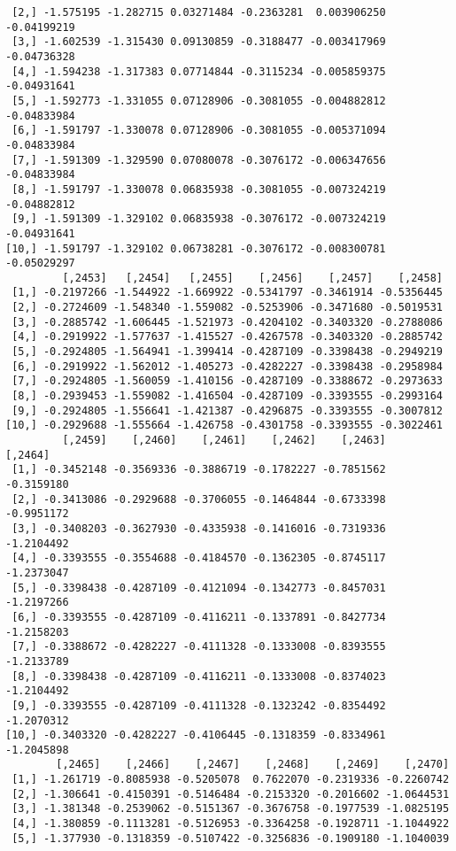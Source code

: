 \documentclass[
  letterpaper,
  DIV=11,
  numbers=noendperiod]{scrreprt}
\begin{document}
\begin{verbatim}
 [2,] -1.575195 -1.282715 0.03271484 -0.2363281  0.003906250 -0.04199219
 [3,] -1.602539 -1.315430 0.09130859 -0.3188477 -0.003417969 -0.04736328
 [4,] -1.594238 -1.317383 0.07714844 -0.3115234 -0.005859375 -0.04931641
 [5,] -1.592773 -1.331055 0.07128906 -0.3081055 -0.004882812 -0.04833984
 [6,] -1.591797 -1.330078 0.07128906 -0.3081055 -0.005371094 -0.04833984
 [7,] -1.591309 -1.329590 0.07080078 -0.3076172 -0.006347656 -0.04833984
 [8,] -1.591797 -1.330078 0.06835938 -0.3081055 -0.007324219 -0.04882812
 [9,] -1.591309 -1.329102 0.06835938 -0.3076172 -0.007324219 -0.04931641
[10,] -1.591797 -1.329102 0.06738281 -0.3076172 -0.008300781 -0.05029297
         [,2453]   [,2454]   [,2455]    [,2456]    [,2457]    [,2458]
 [1,] -0.2197266 -1.544922 -1.669922 -0.5341797 -0.3461914 -0.5356445
 [2,] -0.2724609 -1.548340 -1.559082 -0.5253906 -0.3471680 -0.5019531
 [3,] -0.2885742 -1.606445 -1.521973 -0.4204102 -0.3403320 -0.2788086
 [4,] -0.2919922 -1.577637 -1.415527 -0.4267578 -0.3403320 -0.2885742
 [5,] -0.2924805 -1.564941 -1.399414 -0.4287109 -0.3398438 -0.2949219
 [6,] -0.2919922 -1.562012 -1.405273 -0.4282227 -0.3398438 -0.2958984
 [7,] -0.2924805 -1.560059 -1.410156 -0.4287109 -0.3388672 -0.2973633
 [8,] -0.2939453 -1.559082 -1.416504 -0.4287109 -0.3393555 -0.2993164
 [9,] -0.2924805 -1.556641 -1.421387 -0.4296875 -0.3393555 -0.3007812
[10,] -0.2929688 -1.555664 -1.426758 -0.4301758 -0.3393555 -0.3022461
         [,2459]    [,2460]    [,2461]    [,2462]    [,2463]    [,2464]
 [1,] -0.3452148 -0.3569336 -0.3886719 -0.1782227 -0.7851562 -0.3159180
 [2,] -0.3413086 -0.2929688 -0.3706055 -0.1464844 -0.6733398 -0.9951172
 [3,] -0.3408203 -0.3627930 -0.4335938 -0.1416016 -0.7319336 -1.2104492
 [4,] -0.3393555 -0.3554688 -0.4184570 -0.1362305 -0.8745117 -1.2373047
 [5,] -0.3398438 -0.4287109 -0.4121094 -0.1342773 -0.8457031 -1.2197266
 [6,] -0.3393555 -0.4287109 -0.4116211 -0.1337891 -0.8427734 -1.2158203
 [7,] -0.3388672 -0.4282227 -0.4111328 -0.1333008 -0.8393555 -1.2133789
 [8,] -0.3398438 -0.4287109 -0.4116211 -0.1333008 -0.8374023 -1.2104492
 [9,] -0.3393555 -0.4287109 -0.4111328 -0.1323242 -0.8354492 -1.2070312
[10,] -0.3403320 -0.4282227 -0.4106445 -0.1318359 -0.8334961 -1.2045898
        [,2465]    [,2466]    [,2467]    [,2468]    [,2469]    [,2470]
 [1,] -1.261719 -0.8085938 -0.5205078  0.7622070 -0.2319336 -0.2260742
 [2,] -1.306641 -0.4150391 -0.5146484 -0.2153320 -0.2016602 -1.0644531
 [3,] -1.381348 -0.2539062 -0.5151367 -0.3676758 -0.1977539 -1.0825195
 [4,] -1.380859 -0.1113281 -0.5126953 -0.3364258 -0.1928711 -1.1044922
 [5,] -1.377930 -0.1318359 -0.5107422 -0.3256836 -0.1909180 -1.1040039

\end{verbatim}
\end{document}
